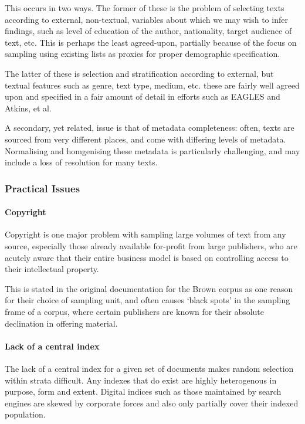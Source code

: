 This occurs in two ways. The former of these is the problem of selecting texts according to external, non-textual, variables about which we may wish to infer findings, such as level of education of the author, nationality, target audience of text, etc. This is perhaps the least agreed-upon, partially because of the focus on sampling using existing lists as proxies for proper demographic specification.

The latter of these is selection and stratification according to external, but textual features such as genre, text type, medium, etc. these are fairly well agreed upon and specified in a fair amount of detail in efforts such as EAGLES and Atkins, et al.  

A secondary, yet related, issue is that of metadata completeness: often, texts are sourced from very different places, and come with differing levels of metadata.  Normalising and homgenising these metadata is particularly challenging, and may include a loss of resolution for many texts.






\subsubsection{Practical Issues}

\paragraph{Copyright}
Copyright is one major problem with sampling large volumes of text from any source, especially those already available for-profit from large publishers, who are acutely aware that their entire business model is based on controlling access to their intellectual property.

This is stated in the original documentation for the Brown corpus as one reason for their choice of sampling unit, and often causes `black spots' in the sampling frame of a corpus, where certain publishers are known for their absolute declination in offering material.


\paragraph{Lack of a central index}
The lack of a central index for a given set of documents makes random selection within strata difficult. Any indexes that do exist are highly heterogenous in purpose, form and extent. Digital indices such as those maintained by search engines are skewed by corporate forces and also only partially cover their indexed population.

